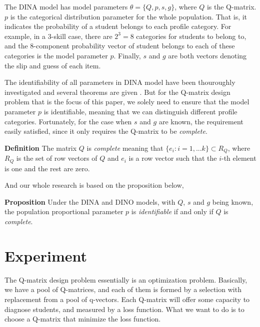 \documentclass{edm_template}
\begin{document}
The DINA model has model parameters $\theta = \{Q, p, s, g\}$, where $Q$ is the Q-matrix. $p$ is the categorical distribution parameter for the whole population. That is, it indicates the probability of a student belongs to each profile category. For example, in a 3-skill case, there are $2^3=8$ categories for students to belong to, and the 8-component probability vector of student belongs to each of these categories is the model parameter $p$. Finally, $s$ and $g$ are both vectors denoting the slip and guess of each item. 

The identifiability of all parameters in DINA model have been thouroughly investigated and several theorems are given \cite{xu2015identifiability}. But for the Q-matrix design problem that is the focus of this paper, we solely need to ensure that the model parameter $p$ is identifiable, meaning that we can distinguish different profile categories. Fortunately, for the case when $s$ and $g$ are known, the requirement easily satisfied, since it only requires the Q-matrix to be \textit{complete}.

\textbf{Definition} \cite{xu2015identifiability}  The matrix $Q$ is \textit{complete} meaning that $\{e_{i}:i=1,...k\} \subset R_{Q}$, where $R_{Q}$ is the set of row vectors of $Q$ and $e_{i}$ is a row vector such that the $i$-th element is one and the rest are zero.

And our whole research is based on the proposition below,

\textbf{Proposition} \cite{xu2015identifiability} Under the DINA and DINO models, with $Q$, $s$ and $g$ being known, the population proportional parameter $p$ is \textit{identifiable} if and only if $Q$ is \textit{complete}.

   
%


\section{Experiment}
The Q-matrix design problem essentially is an optimization problem. Basically, we have a pool of Q-matrices, and each of them is formed by a selection with replacement from a pool of q-vectors. Each Q-matrix will offer some capacity to diagnose students, and measured by a loss function. What we want to do is to choose a Q-matrix that minimize the loss function.
\end{document}
